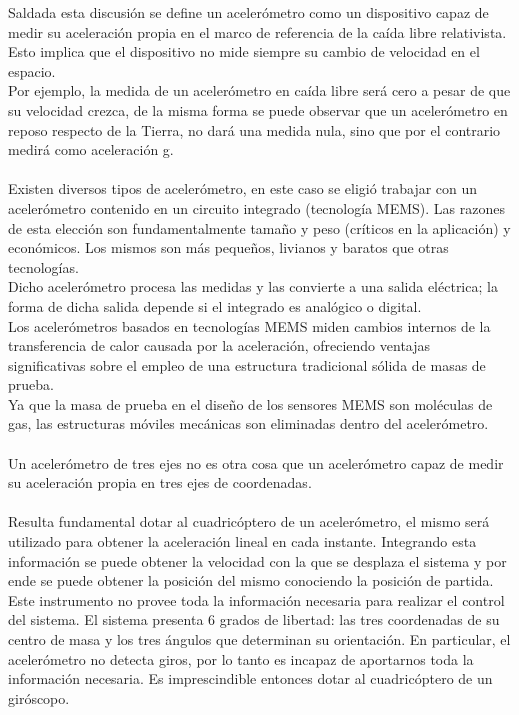 \documentclass[main]{subfiles}
\begin{document}
Saldada esta discusi\'on se define un aceler\'ometro como un dispositivo capaz de medir su aceleraci\'on propia en el marco de referencia de la ca\'ida libre relativista. Esto implica que el dispositivo no mide siempre su cambio de velocidad en el espacio.\\
Por ejemplo, la medida de un aceler\'ometro en ca\'ida libre ser\'a cero a pesar de que su velocidad crezca, de la misma forma se puede observar que un aceler\'ometro en reposo respecto de la Tierra, no dar\'a una medida nula, sino que por el contrario medir\'a como aceleraci\'on g.\\
\\
Existen diversos tipos de aceler\'ometro, en este caso se eligi\'o trabajar con un aceler\'ometro contenido en un circuito integrado (tecnolog\'ia MEMS). Las razones de esta elecci\'on son fundamentalmente tama\~no y peso (cr\'iticos en la aplicaci\'on) y econ\'omicos. Los mismos son m\'as peque\~nos, livianos y baratos que otras tecnolog\'ias.\\
Dicho aceler\'ometro procesa las medidas y las convierte a una salida el\'ectrica; la forma de dicha salida depende si el integrado es anal\'ogico o digital.\\
Los aceler\'ometros basados en tecnolog\'ias MEMS miden cambios internos de la transferencia de calor causada por la aceleraci\'on, ofreciendo ventajas significativas sobre el empleo de una estructura tradicional s\'olida de masas de prueba.\\
Ya que la masa de prueba en el dise\~no de los sensores MEMS son mol\'eculas de gas, las estructuras m\'oviles mec\'anicas son eliminadas dentro del aceler\'ometro.\\
\\
Un aceler\'ometro de tres ejes no es otra cosa que un aceler\'ometro capaz de medir su aceleraci\'on propia en tres ejes de coordenadas.\\
\\
Resulta fundamental dotar al cuadric\'optero de un aceler\'ometro, el mismo ser\'a utilizado para obtener la aceleraci\'on lineal en cada instante. Integrando esta informaci\'on se puede obtener la velocidad con la que se desplaza el sistema y por ende se puede obtener la posici\'on del mismo conociendo la posici\'on de partida.
Este instrumento no provee toda la informaci\'on necesaria para realizar el control del sistema. El sistema presenta 6 grados de libertad: las tres coordenadas de su centro de masa y los tres \'angulos que determinan su orientaci\'on.
En particular, el aceler\'ometro no detecta giros, por lo tanto es incapaz de aportarnos toda la informaci\'on necesaria. Es imprescindible entonces dotar al cuadric\'optero de un gir\'oscopo. 
 
\end{document}
